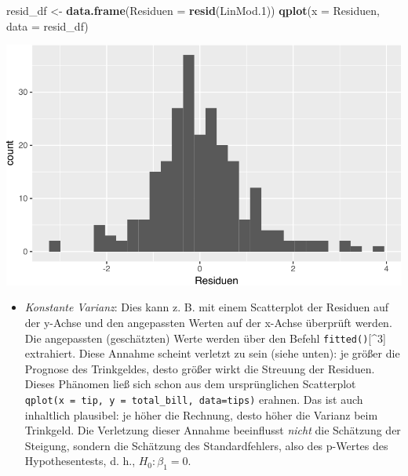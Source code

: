 \documentclass[12pt,]{book}
\newenvironment{Shaded}{\begin{snugshade}}{\end{snugshade}}
\newcommand{\KeywordTok}[1]{\textcolor[rgb]{0.13,0.29,0.53}{\textbf{{#1}}}}
\newcommand{\DataTypeTok}[1]{\textcolor[rgb]{0.13,0.29,0.53}{{#1}}}
\newcommand{\FloatTok}[1]{\textcolor[rgb]{0.00,0.00,0.81}{{#1}}}
\newcommand{\StringTok}[1]{\textcolor[rgb]{0.31,0.60,0.02}{{#1}}}
\newcommand{\NormalTok}[1]{{#1}}
\providecommand{\tightlist}{%
  \setlength{\itemsep}{0pt}\setlength{\parskip}{0pt}}
\begin{document}
\begin{Shaded}
\begin{Highlighting}[]
\NormalTok{resid_df <-}\StringTok{ }\KeywordTok{data.frame}\NormalTok{(}\DataTypeTok{Residuen =} \KeywordTok{resid}\NormalTok{(LinMod}\FloatTok{.1}\NormalTok{))}
\KeywordTok{qplot}\NormalTok{(}\DataTypeTok{x =} \NormalTok{Residuen, }\DataTypeTok{data =} \NormalTok{resid_df)}
\end{Highlighting}
\end{Shaded}

\begin{center}\includegraphics[width=0.7\linewidth]{071_Regression_files/figure-latex/unnamed-chunk-7-1} \end{center}

\begin{itemize}
\tightlist
\item
  \emph{Konstante Varianz}: Dies kann z. B. mit einem Scatterplot der
  Residuen auf der y-Achse und den angepassten Werten auf der x-Achse
  überprüft werden. Die angepassten (geschätzten) Werte werden über den
  Befehl \texttt{fitted()}{[}\^{}3{]} extrahiert. Diese Annahme scheint
  verletzt zu sein (siehe unten): je größer die Prognose des
  Trinkgeldes, desto größer wirkt die Streuung der Residuen. Dieses
  Phänomen ließ sich schon aus dem ursprünglichen Scatterplot
  \texttt{qplot(x\ =\ tip,\ y\ =\ total\_bill,\ data=tips)} erahnen. Das
  ist auch inhaltlich plausibel: je höher die Rechnung, desto höher die
  Varianz beim Trinkgeld. Die Verletzung dieser Annahme beeinflusst
  \emph{nicht} die Schätzung der Steigung, sondern die Schätzung des
  Standardfehlers, also des p-Wertes des Hypothesentests, d. h.,
  \(H_0:\beta_1=0\).
\end{itemize}

\begin{Shaded}
\end{Shaded}
\end{document}
